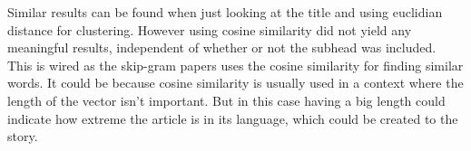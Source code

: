 Similar results can be found when just looking at the title and using euclidian distance for clustering. However using cosine similarity did not yield any meaningful results, independent of whether or not the subhead was included. This is wired as the skip-gram papers \cite{word2vec-comparing, word2vec-details} uses the cosine similarity for finding similar words. It could be because cosine similarity is usually used in a context where the length of the vector isn't important. But in this case having a big length could indicate how extreme the article is in its language, which could be created to the story. 

